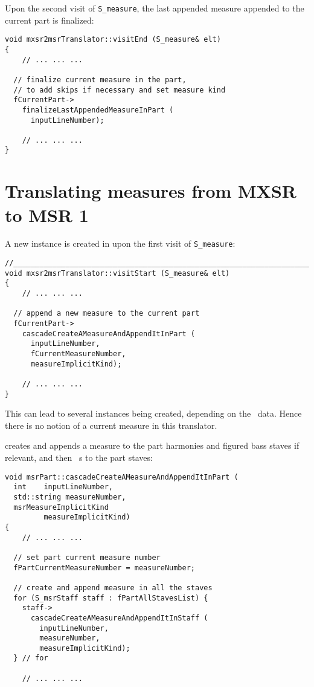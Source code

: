 Upon the second visit of {\tt S_measure}, the last appended measure appended to the current part is finalized:
\begin{lstlisting}[language=CPlusPlus]
void mxsr2msrTranslator::visitEnd (S_measure& elt)
{
	// ... ... ...

  // finalize current measure in the part,
  // to add skips if necessary and set measure kind
  fCurrentPart->
    finalizeLastAppendedMeasureInPart (
      inputLineNumber);

	// ... ... ...
}
\end{lstlisting}


\section{Translating measures from MXSR to MSR 1}

A new  instance is created in  upon the first visit of {\tt S_measure}:
\begin{lstlisting}[language=CPlusPlus]
//________________________________________________________________________
void mxsr2msrTranslator::visitStart (S_measure& elt)
{
	// ... ... ...

  // append a new measure to the current part
  fCurrentPart->
    cascadeCreateAMeasureAndAppendItInPart (
      inputLineNumber,
      fCurrentMeasureNumber,
      measureImplicitKind);

	// ... ... ...
}
\end{lstlisting}

This can lead to several  instances being created, depending on the \mxml\ data. Hence there is no notion of a current measure in this translator.

 creates and appends a measure to the part harmonies and figured bass staves if relevant, and then \cascade\ s to the part staves:
\begin{lstlisting}[language=CPlusPlus]
void msrPart::cascadeCreateAMeasureAndAppendItInPart (
  int    inputLineNumber,
  std::string measureNumber,
  msrMeasureImplicitKind
         measureImplicitKind)
{
	// ... ... ...

  // set part current measure number
  fPartCurrentMeasureNumber = measureNumber;

  // create and append measure in all the staves
  for (S_msrStaff staff : fPartAllStavesList) {
    staff->
      cascadeCreateAMeasureAndAppendItInStaff (
        inputLineNumber,
        measureNumber,
        measureImplicitKind);
  } // for

	// ... ... ...
\end{lstlisting}



